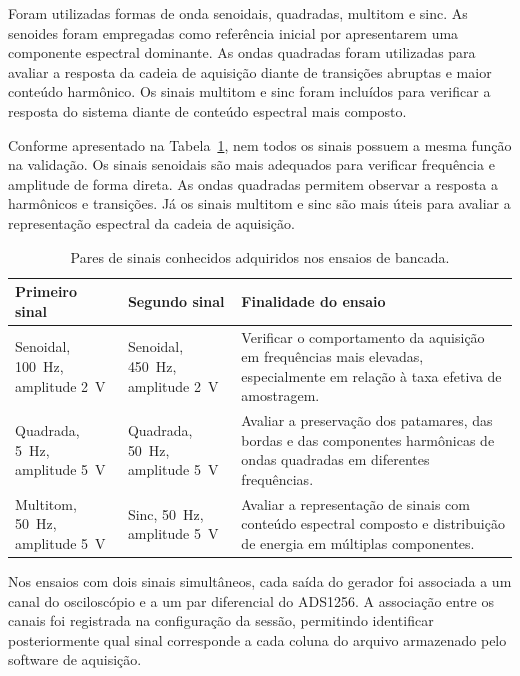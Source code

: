\documentclass[a4paper,12pt]{fcte}
\begin{document}
Foram utilizadas formas de onda senoidais, quadradas, multitom e sinc. As senoides foram empregadas como referência inicial por apresentarem uma componente espectral dominante. As ondas quadradas foram utilizadas para avaliar a resposta da cadeia de aquisição diante de transições abruptas e maior conteúdo harmônico. Os sinais multitom e sinc foram incluídos para verificar a resposta do sistema diante de conteúdo espectral mais composto.

Conforme apresentado na Tabela~\ref{tab:sinais_bancada_adquiridos}, nem todos os sinais possuem a mesma função na validação. Os sinais senoidais são mais adequados para verificar frequência e amplitude de forma direta. As ondas quadradas permitem observar a resposta a harmônicos e transições. Já os sinais multitom e sinc são mais úteis para avaliar a representação espectral da cadeia de aquisição.

\begin{table}[!htb]
    \centering
    \caption{Pares de sinais conhecidos adquiridos nos ensaios de bancada.}
    \label{tab:sinais_bancada_adquiridos}
    \renewcommand{\arraystretch}{1.2}
    \begin{tabularx}{\textwidth}{p{4.2cm}p{4.2cm}X}
        \hline
        \textbf{Primeiro sinal} &
        \textbf{Segundo sinal} &
        \textbf{Finalidade do ensaio} \\
        \hline

        Senoidal, 100~Hz, amplitude 2~V &
        Senoidal, 450~Hz, amplitude 2~V &
        Verificar o comportamento da aquisição em frequências mais elevadas, especialmente em relação à taxa efetiva de amostragem. \\

        Quadrada, 5~Hz, amplitude 5~V &
        Quadrada, 50~Hz, amplitude 5~V &
        Avaliar a preservação dos patamares, das bordas e das componentes harmônicas de ondas quadradas em diferentes frequências. \\

        Multitom, 50~Hz, amplitude 5~V &
        Sinc, 50~Hz, amplitude 5~V &
        Avaliar a representação de sinais com conteúdo espectral composto e distribuição de energia em múltiplas componentes. \\
        \hline
    \end{tabularx}
\end{table}

Nos ensaios com dois sinais simultâneos, cada saída do gerador foi associada a um canal do osciloscópio e a um par diferencial do ADS1256. A associação entre os canais foi registrada na configuração da sessão, permitindo identificar posteriormente qual sinal corresponde a cada coluna do arquivo armazenado pelo software de aquisição.
\end{document}
